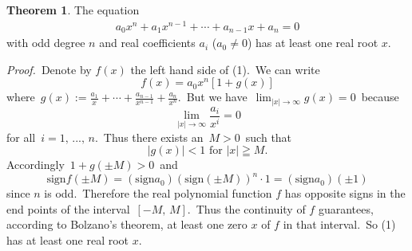 \documentclass{article}
\theoremstyle{definition}
\newtheorem*{thmplain}{Theorem}
\begin{document}
\begin{thmplain}
The equation
\begin{align}
                a_0x^n+a_1x^{n-1}+\cdots+a_{n-1}x+a_n = 0
\end{align}
with odd degree $n$ and real coefficients $a_i$ ($a_0 \ne 0$) has at least one real root $x$.
\end{thmplain}

{\em Proof.}\, Denote by $f(x)$ the left hand side of (1).\, We can write
                      $$f(x) = a_0x^n[1+g(x)]$$
where\, $\displaystyle g(x) := \frac{a_1}{x}\!+\cdots\!+\!\frac{a_{n-1}}{x^{n-1}}\!+\!\frac{a_n}{x^n}$.\, But we have\, 
$\displaystyle\lim_{|x|\to\infty}g(x) = 0$\, because
$$\lim_{|x|\to\infty}\frac{a_i}{x^i} = 0$$
for all\, $i = 1,\,...,\,n$.\, Thus there exists an\, $M > 0$\, such that 
$$|g(x)| < 1\,\, \mbox{for}\,\, |x| \geqq M.$$
Accordingly\, $1+g(\pm M) > 0$\, and
$$\mbox{sign} f(\pm M) = (\mbox{sign} a_0)(\mbox{sign}(\pm M))^n\cdot 1 = 
  (\mbox{sign} a_0)(\pm 1)$$
since $n$ is odd.\, Therefore the real polynomial function $f$ has opposite signs in the end points of the interval\, $[-M,\,M]$.\, Thus the continuity of $f$ guarantees, according to Bolzano's theorem, at least one zero $x$ of $f$ in that interval.\, So (1) has at least one real root $x$.
\end{document}
